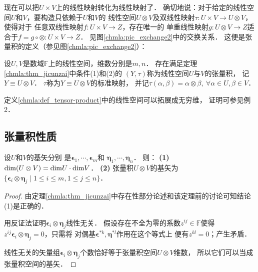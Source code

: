 现在可以把$U\times V$上的{}线性映射转化为{}线性映射了．
确切地说：对于给定的线性空间$U$和$V$，要构造只依赖于$U$和$V$的
线性空间$U\otimes V$及双线性映射$\tau:U\times V \to U\otimes V$，使得对于
任意双线性映射$f:U\times V \to Z$，存在唯一的
单重线性映射$g:U\otimes V\to Z$适合于$f=g\circ \otimes :U\times V \to Z$．
见图\ref{chmla:pic_exchange2}中的交换关系．
这便是张量积的定义（参见图\ref{chmla:pic_exchange2}）：
\begin{definition}\label{chmla:def_tensor-product}
    设$U,V$是数域$\mathbb{F}$上的线性空间，维数分别是$m,n$．
    存在满足定理\ref{chmla:thm_jicunzai}中条件(1)和(2)的
    $(Y,\tau)$称为线性空间$U$与$V$的{\heiti 张量积}，
    记$Y\equiv U\otimes V$．
    $\tau$称为$Y\equiv U\otimes V$的{\heiti 标准映射}，
    并记$\tau(\alpha,\beta)=\alpha \otimes \beta, \ \forall \alpha \in U, \beta \in V$．
\end{definition}

定义\ref{chmla:def_tensor-product}中的线性空间可以拓展成无穷维，
证明可参见\parencite[\S 11.2.2]{qiuws-2019-v2}例2．

\subsection{张量积性质}

\begin{proposition}\label{chmla:thm_tpbases}
    设$U$和$V$的基矢分别
    是$\boldsymbol{\epsilon}_1, \cdots, \boldsymbol{\epsilon}_m$和
    $\boldsymbol{\eta}_1, \cdots, \boldsymbol{\eta}_n$．
    则：
    {\bfseries (1)} ${\rm dim} (U\otimes V)= {\rm dim} U \cdot {\rm dim} V$．
    {\bfseries (2)} 张量积$U\otimes V$的基矢为$\{\boldsymbol{\epsilon}_i \otimes \boldsymbol{\eta}_j \mid
    1 \leqslant i \leqslant m, 1\leqslant j\leqslant n \}$．
\end{proposition}
\begin{proof}
    由定理\ref{chmla:thm_jicunzai}中存在性部分论述和该定理前的讨论可知结论(1)是正确的．

    用反证法证明$\boldsymbol{\epsilon}_i \otimes \boldsymbol{\eta}_j$线性无关．
    假设存在不全为零的系数$z^{ij}\in \mathbb{F}$使得
    $z^{ij}\boldsymbol{\epsilon}_i \otimes \boldsymbol{\eta}_j =0$，只需将
    对偶基$\boldsymbol{\epsilon}^{*k}, \boldsymbol{\eta}^{*l}$作用在这个等式上
    便有$z^{kl}=0$；产生矛盾．

    线性无关的矢量组$\boldsymbol{\epsilon}_i \otimes \boldsymbol{\eta}_j$个数恰好等于张量积空间$U\otimes V$维数，
    所以它们可以当成张量积空间的基矢．
\end{proof}

